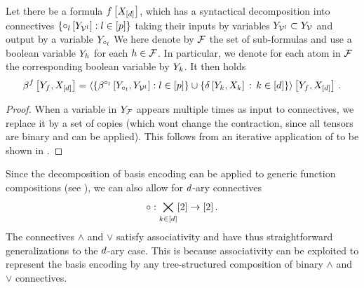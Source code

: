 \begin{theorem}\label{the:formulaDecomposition}
	Let there be a formula $f\left[X_{[d]}\right]$, which has a syntactical decomposition into connectives $\{\circ_{l}\left[Y_{\mathcal{V}^{l}}\right] : l\in[p]\}$ taking their inputs by variables $Y_{\mathcal{V}^{l}}\subset Y_{\mathcal{V}}$ and output by a variable $Y_{\circ_{l}}$
	We here denote by $\mathcal{F}$ the set of sub-formulas and use a boolean variable $Y_{h}$ for each $h\in\mathcal{F}$.
	In particular, we denote for each atom in $\mathcal{F}$ the corresponding boolean variable by $Y_{k}$.
	It then holds
	\begin{align*}
		\beta^{f}\left[Y_{f},X_{[d]}\right] =
		\left\langle \left\{
		\beta^{\circ_{l}}\left[Y_{\circ_{l}},Y_{\mathcal{V}^{l}}\right] : l\in[p]
		\right\} \cup \{\delta\left[Y_{k},X_{k}\right] \, : \, k\in[d]\}\right\rangle \left[ Y_{f},X_{[d]} \right] \, . 
	\end{align*}
\end{theorem}
\begin{proof}
	When a variable in $Y_{\mathcal{F}}$ appears multiple times as input to connectives, we replace it by a set of copies (which wont change the contraction, since all tensors are binary and  can be applied).
	This follows from an iterative application of  to be shown in .
\end{proof}

\begin{remark}\label{rem:naryConnectives}
	Since the decomposition of basis encoding can be applied to generic function compositions (see ), we can also allow for $d$-ary connectives
		\[ \circ : \bigtimes_{k\in[d]} [2] \rightarrow [2] \, . \]
	The connectives $\land$ and $\lor$ satisfy associativity and have thus straightforward generalizations to the $d$-ary case.
	This is because associativity can be exploited to represent the basis encoding by any tree-structured composition of binary $\land$ and $\lor$ connectives.
\end{remark}

